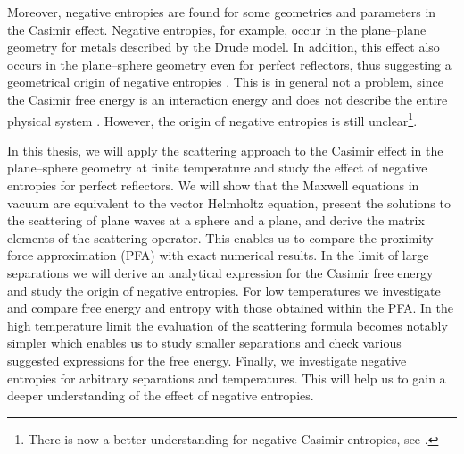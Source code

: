 Moreover, negative entropies are found for some geometries and parameters in
the Casimir effect. Negative entropies, for example, occur in the plane--plane
geometry for metals described by the Drude model. In addition, this effect also
occurs in the plane--sphere geometry even for perfect reflectors, thus
suggesting a geometrical origin of negative entropies
\cite{2014arXiv1405.0311M}. This is in general not a problem, since the Casimir
free energy is an interaction energy and does not describe the entire physical
system \cite{2014arXiv1405.0311M}. However, the origin of negative entropies is
still unclear\footnote{There is now a better understanding for negative Casimir
entropies, see \cite{PhysRevE.91.033203,PhysRevE.92.042125}.}.

In this thesis, we will apply the scattering approach to the Casimir effect in
the plane--sphere geometry at finite temperature and study the effect of
negative entropies for perfect reflectors. We will show that the Maxwell
equations in vacuum are equivalent to the vector Helmholtz equation, present
the solutions to the scattering of plane waves at a sphere and a plane, and
derive the matrix elements of the scattering operator. This enables us to
compare the proximity force approximation (PFA) with exact numerical results.
In the limit of large separations we will derive an analytical expression for
the Casimir free energy and study the origin of negative entropies. For low
temperatures we investigate and compare free energy and entropy with those
obtained within the PFA. In the high temperature limit the evaluation of the
scattering formula becomes notably simpler which enables us to study smaller
separations and check various suggested expressions for the free energy.
Finally, we investigate negative entropies for arbitrary separations and
temperatures. This will help us to gain a deeper understanding of the effect of
negative entropies.
